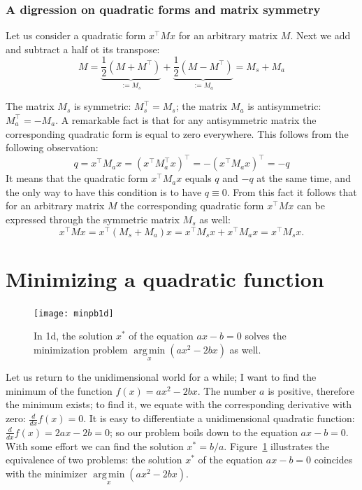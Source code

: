 \documentclass[notitlepage,oneside]{book}
\DeclareMathOperator*{\argmin}{arg\,min}
\begin{document}
\subsubsection{A digression on quadratic forms and matrix symmetry}

Let us consider a quadratic form $x^\top M x$ for an arbitrary matrix $M$. 
Next we add and subtract a half ot its transpose:
$$
M = \underbrace{\frac{1}{2} (M+M^\top)}_{:=M_s} + \underbrace{\frac{1}{2} (M-M^\top)}_{:=M_a} = M_s + M_a
$$

The matrix $M_s$ is symmetric: $M_s^\top = M_s$; the matrix $M_a$ is antisymmetric: $M_a^\top=-M_a$.
A remarkable fact is that for any antisymmetric matrix the corresponding quadratic form is equal to zero everywhere. This follows from the following observation:
$$
q = x^\top M_a x  = (x^\top M_a^\top x)^\top = - (x^\top M_a x)^\top = -q
$$
It means that the quadratic form $x^\top M_a x$ equals $q$ and $-q$ at the same time, and the only way to have this condition is to have $q\equiv 0$.
From this fact it follows that for an arbitrary matrix $M$ the corresponding quadratic form $x^\top M x$ can be expressed through the symmetric matrix $M_s$ as well:
$$
x^\top M x = x^\top (M_s + M_a) x = x^\top M_s x  + x^\top M_a x = x^\top M_s x.
$$


\section{Minimizing a quadratic function}

\begin{figure}[ht]
	\centering
	\texttt{[image: minpb1d]}
	\caption{In 1d, the solution $x^*$ of the equation $ax - b = 0$ solves the minimization problem $\argmin\limits_x(ax^2-2bx)$ as well. }
	\label{fig:min1d}
\end{figure}

Let us return to the unidimensional world for a while; I want to find the minimum of the function $f(x) = ax^2 - 2bx$. 
The number $a$ is positive, therefore the minimum exists; to find it, we equate with the corresponding derivative with zero: $\frac{d}{dx}f(x) = 0$. 
It is easy to differentiate a unidimensional quadratic function: $\frac{d}{dx}f(x) = 2ax - 2b = 0$; so our problem boils down to the equation $ax-b=0$.
With some effort we can find the solution $x^* = b/a$. Figure~\ref{fig:min1d} illustrates the equivalence of two problems:
the solution $x^*$ of the equation $ax-b=0$ coincides with the minimizer $\argmin\limits_x(ax^2 - 2bx)$.
\end{document}
